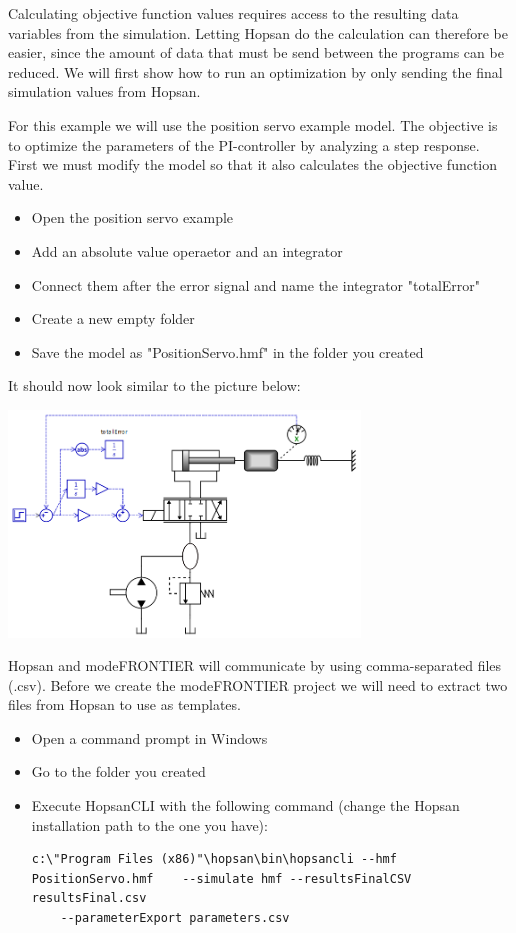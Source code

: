 \documentclass[a4paper]{article}
\begin{document}
Calculating objective function values requires access to the resulting data variables from the simulation. Letting Hopsan do the calculation can therefore be easier, since the amount of data that must be send between the programs can be reduced. We will first show how to run an optimization by only sending the final simulation values from Hopsan.

\begin{tutenumerate}
For this example we will use the position servo example model. The objective is to optimize the parameters of the PI-controller by analyzing a step response. First we must modify the model so that it also calculates the objective function value.

\begin{itemize}
\item Open the position servo example
\item Add an absolute value operaetor and an integrator
\item Connect them after the error signal and name the integrator "totalError"
\item Create a new empty folder
\item Save the model as "PositionServo.hmf" in the folder you created
\end{itemize}

It should now look similar to the picture below:

\begin{center}
\includegraphics[width=0.7\textwidth]{gfx/modefrontier/hopsanmodel.png}\\
\end{center}

Hopsan and modeFRONTIER will communicate by using comma-separated files (.csv). Before we create the modeFRONTIER project we will need to extract two files from Hopsan to use as templates.
\begin{itemize}
\item Open a command prompt in Windows
\item Go to the folder you created
\item Execute HopsanCLI with the following command (change the Hopsan installation path to the one you have):
\begin{lstlisting}[basicstyle=\ttfamily\footnotesize, breaklines=true]
c:\"Program Files (x86)"\hopsan\bin\hopsancli --hmf PositionServo.hmf    --simulate hmf --resultsFinalCSV resultsFinal.csv 
    --parameterExport parameters.csv
\end{lstlisting}
\end{itemize}


\end{tutenumerate}
\end{document}
